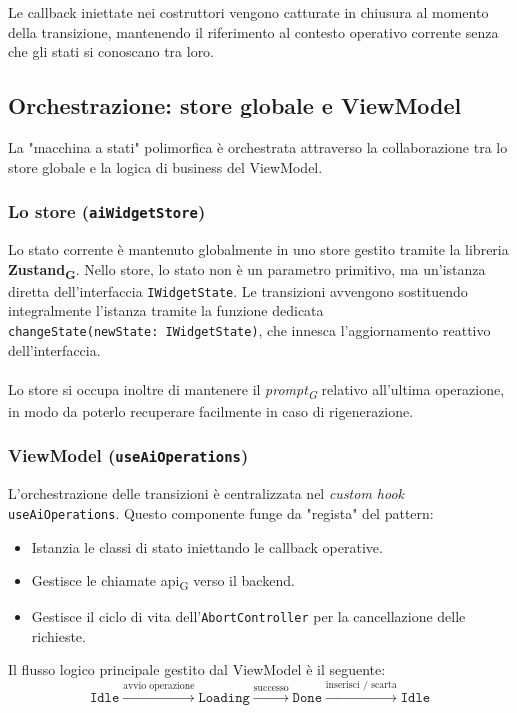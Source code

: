 \documentclass[11pt,a4paper]{article}
\newcommand{\gls}[1]{#1\textsubscript{G}}
\begin{document}
Le callback iniettate nei costruttori vengono catturate in chiusura al momento della transizione, mantenendo il riferimento al contesto operativo corrente senza che gli stati si conoscano tra loro.


\subsection{Orchestrazione: store globale e ViewModel}
La "macchina a stati" polimorfica è orchestrata attraverso la collaborazione tra lo store globale e la logica di business del ViewModel.

\subsubsection{Lo store (\texttt{aiWidgetStore})}
Lo stato corrente è mantenuto globalmente in uno store gestito tramite la libreria \textbf{\gls{Zustand}}. Nello store, lo stato non è un parametro primitivo, ma un'istanza diretta dell'interfaccia \texttt{IWidgetState}. Le transizioni avvengono sostituendo integralmente l'istanza tramite la funzione dedicata\\ \texttt{changeState(newState: IWidgetState)}, che innesca l'aggiornamento reattivo dell'interfaccia.\\\\
Lo store si occupa inoltre di mantenere il \textit{\gls{prompt}} relativo all’ultima operazione, in modo da poterlo recuperare facilmente in caso di rigenerazione.

\subsubsection{ViewModel (\texttt{useAiOperations})}
L'orchestrazione delle transizioni è centralizzata nel \textit{custom hook} \texttt{useAiOperations}. Questo componente funge da "regista" del pattern:
\begin{itemize}
    \item Istanzia le classi di stato iniettando le callback operative.
    \item Gestisce le chiamate \gls{api} verso il backend.
    \item Gestisce il ciclo di vita dell'\texttt{AbortController} per la cancellazione delle richieste.
\end{itemize}

Il flusso logico principale gestito dal ViewModel è il seguente:
\begin{equation*}
\texttt{Idle} \xrightarrow{\text{avvio operazione}} \texttt{Loading} \xrightarrow{\text{successo}} \texttt{Done} \xrightarrow{\text{inserisci / scarta}} \texttt{Idle}
\end{equation*}
\end{document}
